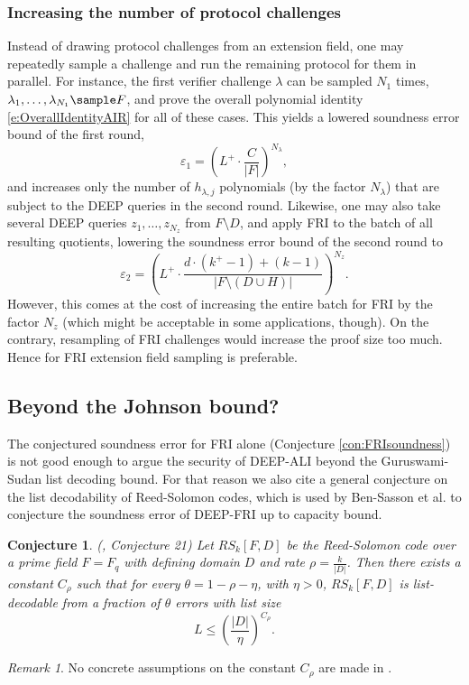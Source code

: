 \documentclass[11pt]{article}
\newtheorem{conj}[]{Conjecture}
\theoremstyle{definition}
\theoremstyle{remark}
\newtheorem{rem}[thm]{Remark}
\begin{document}
\subsubsection{Increasing the number of protocol challenges}
Instead of drawing protocol challenges from an extension field, one may repeatedly sample a challenge and run the remaining protocol for them in parallel. 
For instance, the first verifier challenge $\lambda$ can be sampled $N_1$ times, $\lambda_1,\ldots, \lambda_{N_1}\sample F$, and prove the overall polynomial identity \eqref{e:OverallIdentityAIR} for all of these cases.
This yields a lowered soundness error bound of the first round,
\[
\varepsilon_1 = \left(L^+\cdot\frac{C}{|F|}\right)^{N_\lambda},
\]
and increases only the number of $h_{\lambda,j}$ polynomials  (by the factor $N_\lambda$) that are subject to the DEEP queries in the second round.
Likewise, one may also take several DEEP queries $z_1,\ldots , z_{N_z}$ from $F\setminus D$, and apply FRI to the batch of all resulting quotients, lowering the soundness error bound of the second round to
\[
\varepsilon_2 = \left(L^+\cdot\frac{d\cdot (k^+ - 1) + (k - 1)}{|F\setminus (D\cup H)|}\right)^{N_z}.
\] 
However, this comes at the cost of increasing the entire batch for FRI by the factor $N_z$ (which might be acceptable in some applications, though).
On the contrary, resampling of FRI challenges would increase the proof size too much. 
Hence for  FRI extension field sampling is preferable.  

\subsection{Beyond the Johnson bound?}
\label{s:RSConjecture}

The conjectured soundness error for FRI alone (Conjecture \ref{con:FRIsoundness}) is not good enough to argue the security of DEEP-ALI beyond the Guruswami-Sudan list decoding bound. 
For that reason we also cite a general conjecture on the list decodability of Reed-Solomon codes, which is used by Ben-Sasson et al. to conjecture the soundness error of DEEP-FRI up to capacity bound. 

\begin{conj}
(\cite{DEEPFRI}, Conjecture 21) 
Let $RS_k[F,D]$ be the Reed-Solomon code over a prime field $F=F_q$ with defining domain $D$ and rate $\rho=\frac{k}{|D|}$. 
Then there exists a constant $C_\rho$  such that for every $\theta =1-\rho -\eta$, with $\eta>0$, $RS_k[F,D]$ is list-decodable from a fraction of $\theta$ errors with list size
\[
L \leq\left(\frac{|D|}{\eta}\right)^{C_\rho}.
\]
\end{conj}
\begin{rem}
No concrete assumptions on the constant $C_\rho$ are made in \cite{DEEPFRI}.
\end{rem}
\end{document}
